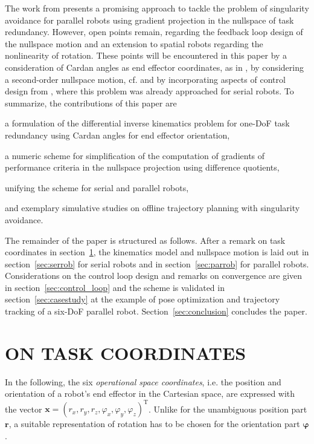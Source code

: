 \documentclass[a4paper,twoside]{article}
\newcommand{\transp}[0]{{\mathrm{T}}}
\begin{document}
The work from \cite{AgarwalNasBan2016} presents a promising approach to tackle the problem of singularity avoidance for parallel robots using gradient projection in the nullspace of task redundancy.
However, open points remain, regarding the feedback loop design of the nullspace motion and an extension to spatial robots regarding the nonlinearity of rotation.
%
These points will be encountered in this paper %
by a consideration of Cardan angles as end effector coordinates, as in \cite{SchapplerTapOrt2019}, by considering a second-order nullspace motion, cf. \cite{ReiterMueGat2018} and by incorporating aspects of control design from \cite{DeLucaOriSic1992}, where this problem was already approached for serial robots.
%
To summarize, the contributions of this paper are
\begin{compactitem}
\item a formulation of the differential inverse kinematics problem for one-DoF task redundancy using Cardan angles for end effector orientation,
\item a numeric scheme for simplification of the computation of gradients of performance criteria in the nullspace projection using difference quotients,
\item unifying the scheme for serial and parallel robots,
\item and exemplary simulative studies on offline trajectory planning with singularity avoidance.
\end{compactitem}

The remainder of the paper is structured as follows.
After a remark on task coordinates in section~\ref{sec:coord},
the kinematics model and nullspace motion is laid out in section~\ref{sec:serrob} for serial robots and in section~\ref{sec:parrob} for parallel robots.
Considerations on the control loop design and remarks on convergence are given in section~\ref{sec:control_loop} and the scheme is validated in section~\ref{sec:casestudy} at the example of pose optimization 
and trajectory tracking 
of a six-DoF parallel robot.
Section~\ref{sec:conclusion} concludes the paper.

\section{\uppercase{On Task Coordinates}}
\label{sec:coord}

In the following, the six \emph{operational space coordinates}, i.e. the position and orientation of a robot's end effector in the Cartesian space, are expressed with the vector $\bm{x}=(r_x,r_y,r_z,\varphi_x,\varphi_y,\varphi_z)^\transp$.
Unlike for the unambiguous position part $\bm{r}$, a suitable representation of rotation has to be chosen for the orientation part $\bm{\varphi}$.
\end{document}
